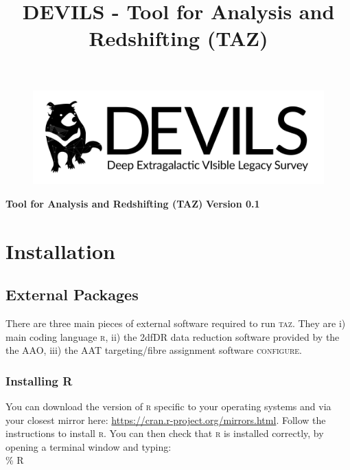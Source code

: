\documentclass[12pt]{article}
\begin{document}
\title{DEVILS - Tool for Analysis and Redshifting (TAZ) }


\begin{figure}
\begin{center}
\includegraphics[scale=0.8]{devils-logo_big.png}
\end{center}
\end{figure}

\begin{center}
\Huge {\textcolor{PineGreen}{\textbf{Tool for Analysis and Redshifting (TAZ)}}}
\Huge {\textcolor{PineGreen}{\textbf{ Version 0.1}}}
\end{center}
\normalsize


\section{Installation}

\subsection{External Packages}

There are three main pieces of external software required to run \textsc{taz}. They are i) main coding language \textsc{r}, ii) the 2dfDR data reduction software provided by the the AAO, iii) the AAT targeting/fibre assignment software \textsc{configure}. 

\subsubsection{Installing R}

You can download the version of \textsc{r} specific to your operating systems and via your closest mirror here: \url{https://cran.r-project.org/mirrors.html}. Follow the instructions to install \textsc{r}. You can then check that \textsc{r} is installed correctly, by opening a terminal window and typing: \\


\hspace{10mm} \% R\\
\end{document}

